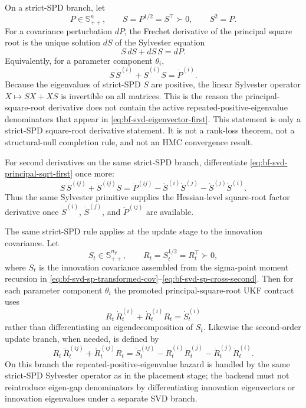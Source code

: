 On a strict-SPD branch, let
\[
  P\in\mathbb S_{++}^n,\qquad
  S=P^{1/2}=S^\top\succ0,\qquad
  S^2=P .
\]
For a covariance perturbation $dP$, the Frechet derivative of the principal
square root is the unique solution $dS$ of the Sylvester equation
\begin{equation}
\label{eq:bf-svd-principal-sqrt-sylvester-first}
  S\,dS+dS\,S=dP .
\end{equation}
Equivalently, for a parameter component $\theta_i$,
\begin{equation}
\label{eq:bf-svd-principal-sqrt-first}
  S\,\dot S^{(i)}+\dot S^{(i)}S=\dot P^{(i)} .
\end{equation}
Because the eigenvalues of strict-SPD $S$ are positive, the linear
Sylvester operator $X\mapsto SX+XS$ is invertible on all matrices.  This is the
reason the principal-square-root derivative does not contain the active
repeated-positive-eigenvalue denominators that appear in
\eqref{eq:bf-svd-eigenvector-first}.  This statement is only a strict-SPD
square-root derivative statement.  It is not a rank-loss theorem, not a
structural-null completion rule, and not an HMC convergence result.

For second derivatives on the same strict-SPD branch, differentiate
\eqref{eq:bf-svd-principal-sqrt-first} once more:
\begin{equation}
\label{eq:bf-svd-principal-sqrt-second}
  S\,\ddot S^{(ij)}+\ddot S^{(ij)}S
  =
  \ddot P^{(ij)}
  -\dot S^{(i)}\dot S^{(j)}
  -\dot S^{(j)}\dot S^{(i)} .
\end{equation}
Thus the same Sylvester primitive supplies the Hessian-level square-root
factor derivative once $\dot S^{(i)}$, $\dot S^{(j)}$, and
$\ddot P^{(ij)}$ are available.

The same strict-SPD rule applies at the update stage to the innovation
covariance.  Let
\[
  S_t\in\mathbb S_{++}^{n_y},\qquad
  R_t=S_t^{1/2}=R_t^\top\succ0,
\]
where $S_t$ is the innovation covariance assembled from the sigma-point moment
recursion in
\eqref{eq:bf-svd-sp-transformed-cov}--\eqref{eq:bf-svd-sp-cross-second}.  Then
for each parameter component $\theta_i$ the promoted principal-square-root UKF
contract uses
\begin{equation}
\label{eq:bf-svd-principal-sqrt-innovation-first}
  R_t\,\dot R_t^{(i)}+\dot R_t^{(i)}R_t=\dot S_t^{(i)}
\end{equation}
rather than differentiating an eigendecomposition of $S_t$.  Likewise the
second-order update branch, when needed, is defined by
\begin{equation}
\label{eq:bf-svd-principal-sqrt-innovation-second}
  R_t\,\ddot R_t^{(ij)}+\ddot R_t^{(ij)}R_t
  =
  \ddot S_t^{(ij)}
  -\dot R_t^{(i)}\dot R_t^{(j)}
  -\dot R_t^{(j)}\dot R_t^{(i)} .
\end{equation}
On this branch the repeated-positive-eigenvalue hazard is handled by the same
strict-SPD Sylvester operator as in the placement stage; the backend must not
reintroduce eigen-gap denominators by differentiating innovation eigenvectors or
innovation eigenvalues under a separate SVD branch.

